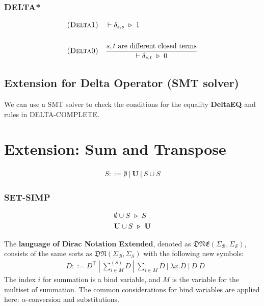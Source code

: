 \subsubsection*{\textsf{DELTA*}}
\begin{align*}
  & \textsc{(Delta1)} && 
  \vdash \delta_{s, s} \ \triangleright\  1
  \\
  \\
  & \textsc{(Delta0)} &&
  \frac{s, t \text{ are different closed terms}}{\vdash \delta_{s, t} \ \triangleright\  0}
\end{align*}

\subsection{Extension for Delta Operator (SMT solver)}
We can use a SMT solver to check the conditions for the equality \textbf{DeltaEQ} and rules in \textsf{DELTA-COMPLETE}.


\section{Extension: Sum and Transpose}
\begin{definition}[Set]
  \begin{align*}
    S ::= \emptyset\ |\ \mathbf{U}\ |\ S \cup S
  \end{align*}
\end{definition}

\subsubsection*{\textsf{SET-SIMP}}
\begin{align*}
  & \emptyset \cup S \ \triangleright\  S \\
  & \mathbf{U} \cup S \ \triangleright\  \mathbf{U} \\
\end{align*}

\begin{definition}[DNE]
    The \textbf{language of Dirac Notation Extended}, denoted as $\mathfrak{DNE}(\Sigma_\mathcal{B}, \Sigma_\mathcal{S})$, consists of the same sorts as $\mathfrak{DN}(\Sigma_\mathcal{B}, \Sigma_\mathcal{S})$ with the following new symbols:
    \begin{align*}
        & D ::= D^\top\ |\ \sum^{(S)}_{i \in M} D\ |\ \sum_{i \in M} D\ |\ \lambda x.D\ |\ D\ D
    \end{align*}
    The index $i$ for summation is a bind variable, and $M$ is the variable for the multiset of summation. The common considerations for bind variables are applied here: $\alpha$-conversion and substitutions.
\end{definition}

